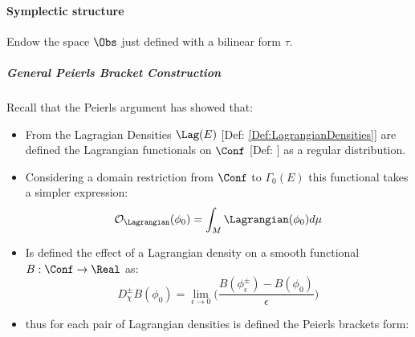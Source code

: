 \documentclass[Main]{subfiles}
\begin{document}
		\paragraph{Symplectic structure}
			Endow the space $\Obs$ just defined with a bilinear form $\tau$.
			\subparagraph{General Peierls Bracket Construction}
				Recall that the Peierls argument has showed that:
				\begin{itemize}
					\item From the Lagragian Densities $\Lag(E)$ [Def: \ref{Def:LagrangianDensities}] are defined the Lagrangian functionals on $\Conf$ [Def: \label{Def:LagrangianFunctionals}] as a regular distribution.
					\item Considering a domain restriction from $\Conf$ to $\Gamma_0(E)$  this functional takes a simpler expression:
					\begin{displaymath}
						\mathcal{O}_\Lagrangian( \phi_0) = \int_M \Lagrangian(\phi_0) d\mu
					\end{displaymath}
					\item Is defined the effect of a Lagrangian density  on a smooth functional $B: \Conf \rightarrow \Real$ as:
						\begin{displaymath}
							D_\chi^\pm B (\phi_0) = \lim_{\epsilon\rightarrow 0} \big( \frac{B(\phi_\epsilon^\pm) - B (\phi_0)} {\epsilon} \big)
						\end{displaymath}
					\item thus for each pair of Lagrangian densities is defined the Peierls brackets form:
				\end{itemize}				 
		
\end{document}
